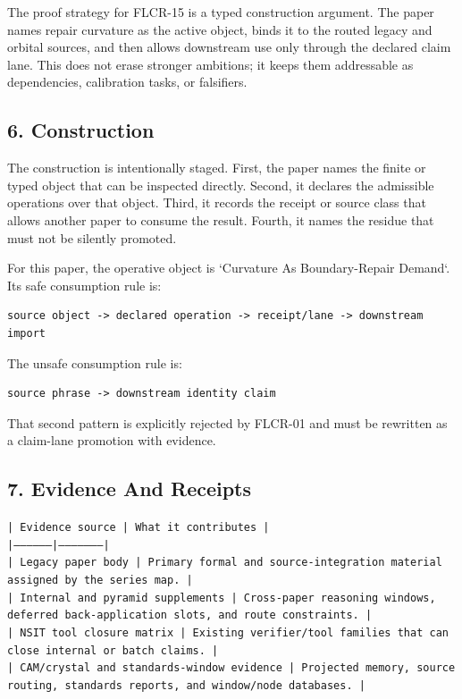 \documentclass[11pt]{article}
\begin{document}
The proof strategy for FLCR-15 is a typed construction argument. The paper names repair curvature as the active object, binds it to the routed legacy and orbital sources, and then allows downstream use only through the declared claim lane. This does not erase stronger ambitions; it keeps them addressable as dependencies, calibration tasks, or falsifiers.

\subsection*{6. Construction}

The construction is intentionally staged. First, the paper names the finite or
typed object that can be inspected directly. Second, it declares the admissible
operations over that object. Third, it records the receipt or source class that
allows another paper to consume the result. Fourth, it names the residue that
must not be silently promoted.

For this paper, the operative object is `Curvature As Boundary-Repair Demand`. Its safe consumption
rule is:

\begin{verbatim}
source object -> declared operation -> receipt/lane -> downstream import
\end{verbatim}

The unsafe consumption rule is:

\begin{verbatim}
source phrase -> downstream identity claim
\end{verbatim}

That second pattern is explicitly rejected by FLCR-01 and must be rewritten as
a claim-lane promotion with evidence.

\subsection*{7. Evidence And Receipts}

\noindent\texttt{| Evidence source | What it contributes |}\\
\noindent\texttt{|-----------------|---------------------|}\\
\noindent\texttt{| Legacy paper body | Primary formal and source-integration material assigned by the series map. |}\\
\noindent\texttt{| Internal and pyramid supplements | Cross-paper reasoning windows, deferred back-application slots, and route constraints. |}\\
\noindent\texttt{| NSIT tool closure matrix | Existing verifier/tool families that can close internal or batch claims. |}\\
\noindent\texttt{| CAM/crystal and standards-window evidence | Projected memory, source routing, standards reports, and window/node databases. |}\\
\end{document}
